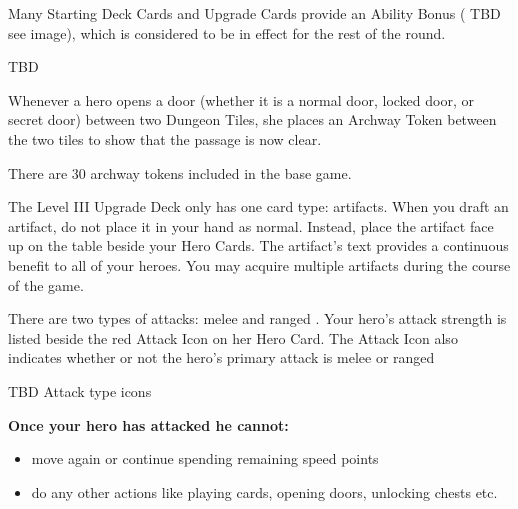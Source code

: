 \label{sec:RulesReferenceGuide}

Many Starting Deck Cards and Upgrade Cards provide an Ability Bonus ( TBD see image), which is considered to be in effect for the rest of the round.

TBD


Whenever a hero opens a door (whether it is a normal door, locked door, or secret door) between two Dungeon Tiles, she places an Archway Token between the two tiles to show that the passage is now clear.

There are 30 archway tokens included in the base game.


The Level III Upgrade Deck only has one card type: artifacts. When you draft an artifact, do not place it in your hand as normal. Instead, place the artifact face up on the table beside your Hero Cards. The artifact’s text provides a continuous benefit to all of your heroes. You may acquire multiple artifacts during the course of the game.


There are two types of attacks: melee and ranged . Your hero’s attack strength is listed beside the red Attack Icon on her Hero Card. The Attack Icon also indicates whether or not the hero’s primary attack is melee or ranged

TBD Attack type icons

\textbf{Once your hero has attacked he cannot:}
\begin{itemize}
  \item move again or continue spending remaining speed points
  \item do any other actions like playing cards, opening doors, unlocking chests etc.
\end{itemize}




